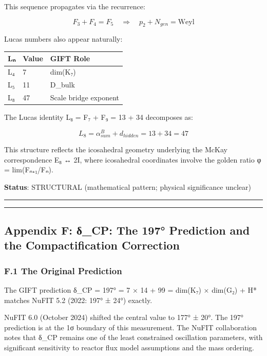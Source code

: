 \documentclass[11pt,a4paper]{article}
\begin{document}
This sequence propagates via the recurrence:

\[F_3 + F_4 = F_5 \quad \Rightarrow \quad p_2 + N_{gen} = \text{Weyl}\]

Lucas numbers also appear naturally:

{\def\LTcaptype{none} %
\begin{longtable}[]{@{}lll@{}}
\toprule\noalign{}
Lₙ & Value & GIFT Role \\
\midrule\noalign{}
\endhead
\bottomrule\noalign{}
\endlastfoot
L₄ & 7 & dim(K₇) \\
L₅ & 11 & D\_bulk \\
L₈ & 47 & Scale bridge exponent \\
\end{longtable}
}

The Lucas identity L₈ = F₇ + F₉ = 13 + 34 decomposes as:

\[L_8 = \alpha_{sum}^B + d_{hidden} = 13 + 34 = 47\]

This structure reflects the icosahedral geometry underlying the McKay correspondence E₈ ↔ 2I, where icosahedral coordinates involve the golden ratio φ = lim(Fₙ₊₁/Fₙ).

\textbf{Status}: STRUCTURAL (mathematical pattern; physical significance unclear)

\begin{center}\rule{0.5\linewidth}{0.5pt}\end{center}

\begin{center}\rule{0.5\linewidth}{0.5pt}\end{center}

\subsection{Appendix F: δ\_CP: The 197° Prediction and the Compactification Correction}\label{appendix-f-ux3b4_cp-the-197-prediction-and-the-compactification-correction}

\subsubsection{F.1 The Original Prediction}\label{f.1-the-original-prediction}

The GIFT prediction δ\_CP = 197° = 7 × 14 + 99 = dim(K₇) × dim(G₂) + H* matches
NuFIT 5.2 (2022: 197° ± 24°) exactly.

NuFIT 6.0 (October 2024) shifted the central value to 177° ± 20°. The 197° prediction
is at the 1σ boundary of this measurement. The NuFIT collaboration notes that δ\_CP
remains one of the least constrained oscillation parameters, with significant sensitivity
to reactor flux model assumptions and the mass ordering.
\end{document}
